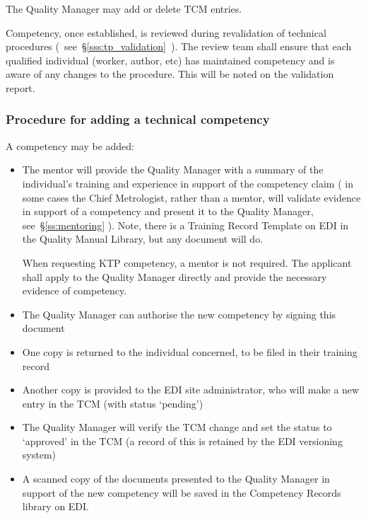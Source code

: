 The Quality Manager may add or delete TCM entries. 

Competency, once established, is reviewed during revalidation of technical procedures (~see~\S\ref{sss:tp_validation}~).  The review team shall ensure that each qualified individual (worker, author, etc) has maintained competency and is aware of any changes to the procedure. This will be noted on the validation report. 

\subsubsection{Procedure for adding a technical competency}
\label{sss:tcm_procedure}
A competency may be added:
\begin{itemize}
\item The mentor will provide the Quality Manager with a summary of the individual's training and experience in support of the competency claim ( in some cases the Chief Metrologist, rather than a mentor, will validate evidence in support of a competency and present it to the Quality Manager, see~\S\ref{ss:mentoring} ). Note, there is a Training Record Template on EDI in the Quality Manual Library, but any document will do.

When requesting KTP competency, a mentor is not required. The applicant shall apply to the Quality Manager directly and provide the necessary evidence of competency.

\item The Quality Manager can authorise the new competency by signing this document 

\item One copy is returned to the individual concerned, to be filed in their training record

\item Another copy is provided to the EDI site administrator, who will make a new entry in the TCM (with status ‘pending') 

\item The Quality Manager will verify the TCM change and set the status to ‘approved' in the TCM (a record of this is retained by the EDI versioning system)

\item A scanned copy of the documents presented to the Quality Manager in support of the new competency will be saved in the Competency Records library on EDI.
\end{itemize}

